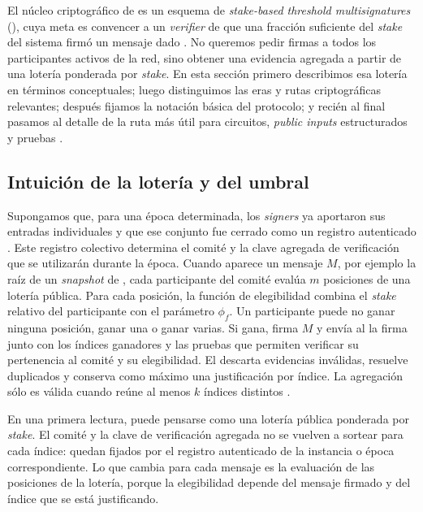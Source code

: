 
El núcleo criptográfico de \Mithril es un esquema de \textit{stake-based threshold multisignatures} (\STM), cuya meta es convencer a un \textit{verifier} de que una fracción suficiente del \textit{stake} del sistema firmó un mensaje dado \cite{cryptoeprint:2021/916}. No queremos pedir firmas a todos los participantes activos de la red, sino obtener una evidencia agregada a partir de una lotería ponderada por \textit{stake}. En esta sección primero describimos esa lotería en términos conceptuales; luego distinguimos las eras y rutas criptográficas relevantes; después fijamos la notación básica del protocolo; y recién al final pasamos al detalle de la ruta más útil para circuitos, \textit{public inputs} estructurados y pruebas \ZK.

\subsection{Intuición de la lotería y del umbral}
\label{subsec:protocolo-stm-y-esquemas-de-firma-intuicion-de-la-loteria-y-del-umbral}

Supongamos que, para una época determinada, los \textit{signers} ya aportaron sus entradas individuales y que ese conjunto fue cerrado como un registro autenticado \AuthReg. Este registro colectivo determina el comité y la clave agregada de verificación \AVK que se utilizarán durante la época. Cuando aparece un mensaje $M$, por ejemplo la raíz de un \textit{snapshot} de \Cardano, cada participante del comité evalúa $m$ posiciones de una lotería pública. Para cada posición, la función de elegibilidad combina el \textit{stake} relativo del participante con el parámetro $\phi_f$. Un participante puede no ganar ninguna posición, ganar una o ganar varias. Si gana, firma $M$ y envía al \MithrilAggregator la firma junto con los índices ganadores y las pruebas que permiten verificar su pertenencia al comité y su elegibilidad. El \MithrilAggregator descarta evidencias inválidas, resuelve duplicados y conserva como máximo una justificación por índice. La agregación sólo es válida cuando reúne al menos $k$ índices distintos \cite{MithrilDocsProtocol,cryptoeprint:2021/916}.

En una primera lectura, \STM puede pensarse como una lotería pública ponderada por \textit{stake}. El comité y la clave de verificación agregada no se vuelven a sortear para cada índice: quedan fijados por el registro autenticado de la instancia o época correspondiente. Lo que cambia para cada mensaje es la evaluación de las posiciones de la lotería, porque la elegibilidad depende del mensaje firmado y del índice que se está justificando.

